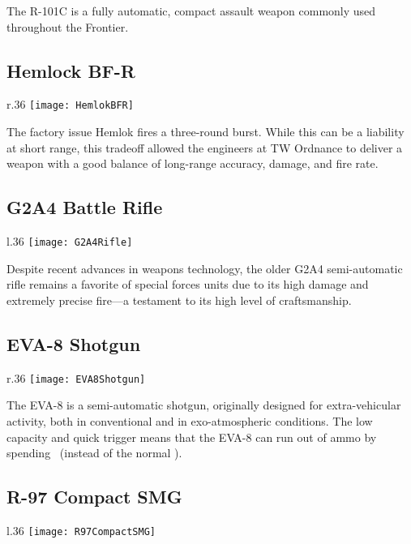 The R-101C is a fully automatic, compact assault weapon commonly used throughout the Frontier. 


\subsection{Hemlock BF-R}
\begin{wrapfigure}[5]{r}{.36\linewidth}
\vspace*{-2em}
\texttt{[image: HemlokBFR]}
\end{wrapfigure}
The factory issue Hemlok fires a three-round burst. While this can be a liability at short range, this tradeoff allowed the engineers at TW Ordnance to deliver a weapon with a good balance of long-range accuracy, damage, and fire rate.

\subsection{G2A4 Battle Rifle}
\begin{wrapfigure}[4]{l}{.36\linewidth}
\vspace*{-2em}
\texttt{[image: G2A4Rifle]}
\end{wrapfigure}


Despite recent advances in weapons technology, the older G2A4 semi-automatic rifle remains a favorite of special forces units due to its high damage and extremely precise fire---a testament to its high level of craftsmanship.

\subsection{EVA-8 Shotgun}
\begin{wrapfigure}[5]{r}{.36\linewidth}
\vspace*{-2em}
\texttt{[image: EVA8Shotgun]}
\end{wrapfigure}


The EVA-8 is a semi-automatic shotgun, originally designed for extra-vehicular activity, both in conventional and in exo-atmospheric conditions. The low capacity and quick trigger means that the EVA-8 can run out of ammo by spending \Threat\Threat\Threat\ (instead of the normal \Despair).

\subsection{R-97 Compact SMG}
\begin{wrapfigure}[3]{l}{.36\linewidth}
\vspace*{-2em}
\texttt{[image: R97CompactSMG]}
\end{wrapfigure}

